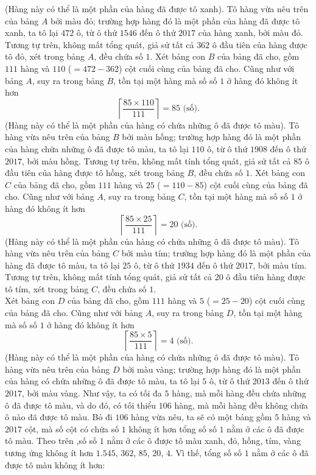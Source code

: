 \begin{bt}
{		(Hàng này có thể là một phần của hàng đã được tô xanh).
		Tô hàng vừa nêu trên của bảng $A$ bởi màu đỏ; trường hợp hàng đó là một phần của hàng đã được tô xanh, ta tô lại $472$ ô, từ ô thứ $1546$ đến ô thứ $2017$ của hàng xanh, bởi màu đỏ. Tương tự trên, không mất tổng quát, giả sử tất cả $362$ ô đầu tiên của hàng được tô đỏ, xét trong bảng $A$, đều chứa số $1$.
		Xét bảng con $B$ của bảng đã cho, gồm $111$ hàng và $110$ ($=472-362$) cột cuối cùng của bảng đã cho. Cũng như với bảng $A$, suy ra trong bảng $B$, tồn tại một hàng mà số số $1$ ở hàng đó không ít hơn $$\left\lceil\dfrac{85\times110}{111}\right\rceil=85 \,\, \text{(số).}$$
		(Hàng này có thể là một phần của hàng có chứa những ô đã được tô màu).
		Tô hàng vừa nêu trên của bảng $B$ bởi màu hồng; trường hợp hàng đó là một phần của hàng chứa những ô đã được tô màu, ta tô lại $110$ ô, từ ô thứ $1908$ đến ô thứ $2017$, bởi màu hồng. Tương tự trên, không mất tính tổng quát, giả sử tất cả $85$ ô đầu tiên của hàng được tô hồng, xét trong bảng $B$, đều chứa số $1$.
		Xét bảng con $C$ của bảng đã cho, gồm $111$ hàng và $25$ ($=110-85$) cột cuối cùng của bảng đã cho. Cũng như với bảng $A$, suy ra trong bảng $C$, tồn tại một hàng mà số số $1$ ở hàng đó không ít hơn $$\left\lceil\dfrac{85\times25}{111}\right\rceil=20\,\, \text{(số)}.$$
		(Hàng này có thể là một phần của hàng có chứa những ô đã được tô màu).
		Tô hàng vừa nêu trên của bảng $C$ bởi màu tím; trường hợp hàng đó là một phần của hàng đã được tô màu, ta tô lại $25$ ô, từ ô thứ $1934$ đến ô thứ $2017$, bởi màu tím. Tương tự trên, không mất tính tổng quát, giả sử tất cả $20$ ô đầu tiên hàng được tô tím, xét trong bảng $C$, đều chứa số $1$.\\
		Xét bảng con $D$ của bảng đã cho, gồm $111$ hàng và $5$ ($=25-20$) cột cuối cùng của bảng đã cho. Cũng như với bảng $A$, suy ra trong bảng $D$, tồn tại một hàng mà số số $1$ ở hàng đó không ít hơn $$\left\lceil\dfrac{85\times5}{111}\right\rceil=4\,\, \text{(số).}$$
		(Hàng này có thể là một phần của hàng có chứa những ô đã được tô màu).
		Tô hàng vừa nêu trên của bảng $D$ bởi màu vàng; trường hợp hàng đó là một phần của hàng có chứa những ô đã được tô màu, ta tô lại $5$ ô, từ ô thứ $2013$ đến ô thứ $2017$, bởi màu vàng.
		Như vậy, ta có tối đa $5$ hàng, mà mỗi hàng đều chứa những ô đã được tô màu, và do đó, có tối thiểu $106$ hàng, mà mỗi hàng đều không chứa ô nào đã được tô màu. Bỏ đi $106$ hàng vừa nêu, ta sẽ có một bảng gồm $5$ hàng và $2017$ cột, mà số cột có chứa số $1$ không ít hơn tổng số số $1$ nằm ở các ô đã được tô màu. Theo trên ,số số $1$ nằm ở các ô được tô màu xanh, đỏ, hồng, tím, vàng tương ứng không ít hơn $1{.}545$, $362$, $85$, $20$, $4$. Vì thế, tổng số số $1$ nằm ở các ô đã được tô màu không ít hơn: 
}
\end{bt}
